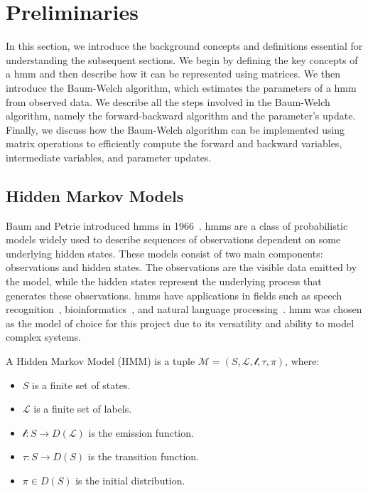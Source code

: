 \section{Preliminaries}\label{sec:preliminaries}
In this section, we introduce the background concepts and definitions essential for understanding the subsequent sections.
We begin by defining the key concepts of a \gls{hmm} and then describe how it can be represented using matrices.
We then introduce the Baum-Welch algorithm, which estimates the parameters of a \gls{hmm} from observed data.
We describe all the steps involved in the Baum-Welch algorithm, namely the forward-backward algorithm and the parameter's update.
Finally, we discuss how the Baum-Welch algorithm can be implemented using matrix operations to efficiently compute the forward and backward variables, intermediate variables, and parameter updates.

\subsection{Hidden Markov Models}\label{subsec:hmm}
Baum and Petrie introduced \glspl{hmm} in 1966~\cite{baum1966statistical}.
\glspl{hmm} are a class of probabilistic models widely used to describe sequences of observations dependent on some underlying hidden states.
These models consist of two main components: observations and hidden states.
The observations are the visible data emitted by the model, while the hidden states represent the underlying process that generates these observations.
\glspl{hmm} have applications in fields such as speech recognition~\cite{chavan2013overview}, bioinformatics~\cite{de2007hidden}, and natural language processing~\cite{murveit1990integrating}.
\gls{hmm} was chosen as the model of choice for this project due to its versatility and ability to model complex systems.

\begin{definition}
    A Hidden Markov Model (HMM) is a tuple $\mathcal{M} = (S, \mathcal{L}, \mathscr{l}, \tau,  \pi)$, where:
    \begin{itemize}
        \item $S$ is a finite set of states.
        \item $\mathcal{L}$ is a finite set of labels.
        \item $\mathscr{l}: S \rightarrow D(\mathcal{L})$ is the emission function.
        \item $\tau: S \rightarrow D(S)$ is the transition function.
        \item $\pi \in D(S)$ is the initial distribution.
    \end{itemize}
\end{definition}

